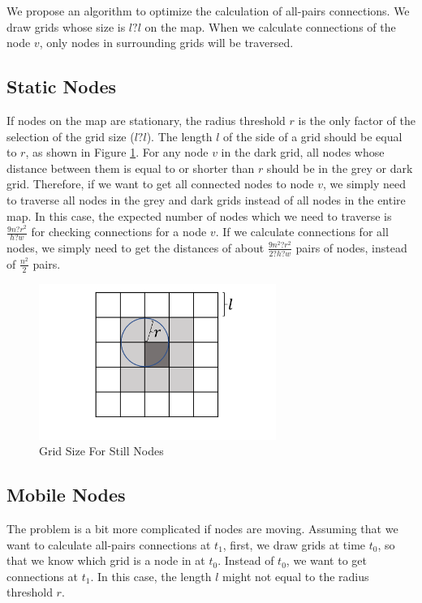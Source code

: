 \noindent We propose an algorithm to optimize the calculation of all-pairs connections. We draw grids whose size is $l\mathrm{?}l$ on the map. When we calculate connections of the node $v$, only nodes in surrounding grids will be traversed.


\subsection{ Static Nodes}

\noindent If nodes on the map are stationary, the radius threshold $r$ is the only factor of the selection of the grid size ($l\mathrm{?}l$). The length $l$ of the side of a grid should be equal to $r$, as shown in Figure \ref{fig:F53GridSizeForStillNodes}. For any node $v$ in the dark grid, all nodes whose distance between them is equal to or shorter than $r$ should be in the grey or dark grid. Therefore, if we want to get all connected nodes to node $v$, we simply need to traverse all nodes in the grey and dark grids instead of all nodes in the entire map. In this case, the expected number of nodes which we need to traverse is $\frac{9n\mathrm{?}r^2}{h\mathrm{?}w}$ for checking connections for a node $v$. If we calculate connections for all nodes, we simply need to get the distances of about $\frac{9n^2\mathrm{?}r^2}{2\mathrm{?}h\mathrm{?}w}$ pairs of nodes, instead of $\frac{n^2}{2}$ pairs.

\begin{figure} [hbtp]
  \centering 
  \includegraphics[height=2in]{figures/F53GridSizeForStillNodes.png}
  \caption{Grid Size For Still Nodes} 
  \label{fig:F53GridSizeForStillNodes} %
\end{figure}


\subsection{ Mobile Nodes}

\noindent The problem is a bit more complicated if nodes are moving. Assuming that we want to calculate all-pairs connections at $t_1$, first, we draw grids at time $t_0$, so that we know which grid is a node in at $t_0$. Instead of $t_0$, we want to get connections at $t_1$. In this case, the length $l$ might not equal to the radius threshold $r$.

